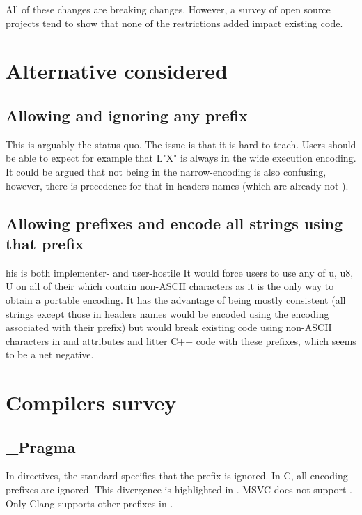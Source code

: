 \documentclass{wg21}
\begin{document}
All of these changes are breaking changes.
However, a survey of open source projects tend to show that none of the restrictions added
impact existing code.

\section{Alternative considered}

\subsection{Allowing and ignoring any prefix}

This is arguably the status quo.
The issue is that it is hard to teach. Users should be able to expect for example that L"X"
is always in the wide execution encoding.
It could be argued that  not being in the narrow-encoding is also confusing, however, there is precedence for that in headers names (which are already not ).

\subsection{Allowing prefixes and encode all strings using that prefix}

his is both implementer- and user-hostile It would force users to use any of u, u8, U
on all of their  which contain non-ASCII characters as it is the only way to obtain a portable encoding.
It has the advantage of being mostly consistent (all strings except those in headers names would be encoded using the encoding associated with their prefix) but would break
existing code using non-ASCII characters in  and attributes and
litter C++ code with these prefixes, which seems to be a net negative.

\section{Compilers survey}

\subsection{_Pragma}

In  directives, the standard specifies that the  prefix is ignored.
In C, all encoding prefixes are ignored. This divergence is highlighted in .
MSVC does not support .  Only Clang supports other prefixes in .
\end{document}
